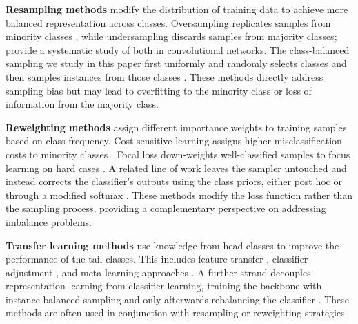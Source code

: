 \documentclass[12pt,a4paper]{article}
\begin{document}
\textbf{Resampling methods} modify the distribution of training data to achieve more balanced representation across classes. Oversampling replicates samples from minority classes \citep{chawla2002smote}, while undersampling discards samples from majority classes; \citet{buda2018systematic} provide a systematic study of both in convolutional networks. The class-balanced sampling we study in this paper first uniformly and randomly selects classes and then samples instances from those classes \citep{shen2016relay, kang2020decoupling}. These methods directly address sampling bias but may lead to overfitting to the minority class or loss of information from the majority class.

\textbf{Reweighting methods} assign different importance weights to training samples based on class frequency. Cost-sensitive learning assigns higher misclassification costs to minority classes \citep{cui2019class}. Focal loss down-weights well-classified samples to focus learning on hard cases \citep{lin2017focal}. A related line of work leaves the sampler untouched and instead corrects the classifier's outputs using the class priors, either post hoc or through a modified softmax \citep{ren2020balanced, menon2021logit}. These methods modify the loss function rather than the sampling process, providing a complementary perspective on addressing imbalance problems.

\textbf{Transfer learning methods} use knowledge from head classes to improve the performance of the tail classes. This includes feature transfer \citep{liu2019large}, classifier adjustment \citep{saerens2002adjusting}, and meta-learning approaches \citep{wang2017tail}. A further strand decouples representation learning from classifier learning, training the backbone with instance-balanced sampling and only afterwards rebalancing the classifier \citep{kang2020decoupling, zhou2020bbn}. These methods are often used in conjunction with resampling or reweighting strategies.
\end{document}
